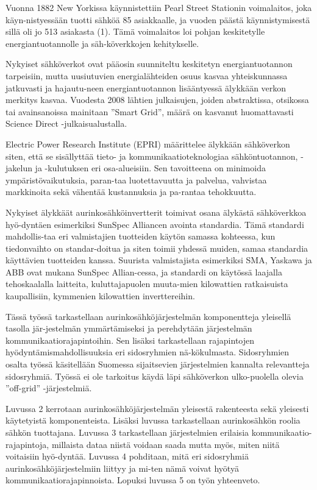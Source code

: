 Vuonna 1882 New Yorkissa käynnistettiin Pearl Street Stationin voimalaitos, joka käyn-nistyessään tuotti sähköä 85 asiakkaalle, ja vuoden päästä käynnistymisestä sillä oli jo 513 asiakasta (1). Tämä voimalaitos loi pohjan keskitetylle energiantuotannolle ja säh-köverkkojen kehitykselle. 

Nykyiset sähköverkot ovat pääosin suunniteltu keskitetyn energiantuotannon tarpeisiin, mutta uusiutuvien energialähteiden osuus kasvaa yhteiskunnassa jatkuvasti ja hajautu-neen energiantuotannon lisääntyessä älykkään verkon merkitys kasvaa. Vuodesta 2008 lähtien julkaisujen, joiden abstraktissa, otsikossa tai avainsanoissa mainitaan ”Smart Grid”, määrä on kasvanut huomattavasti Science Direct -julkaisualustalla.

Electric Power Research Institute (EPRI) määrittelee älykkään sähköverkon siten, että se sisällyttää tieto- ja kommunikaatioteknologiaa sähköntuotannon, -jakelun ja -kulutuksen eri osa-alueisiin. Sen tavoitteena on minimoida ympäristövaikutuksia, paran-taa luotettavuutta ja palvelua, vahvistaa markkinoita sekä vähentää kustannuksia ja pa-rantaa tehokkuutta. 

Nykyiset älykkäät aurinkosähköinvertterit toimivat osana älykästä sähköverkkoa hyö-dyntäen esimerkiksi SunSpec Alliancen avointa standardia. Tämä standardi mahdollis-taa eri valmistajien tuotteiden käytön samassa kohteessa, kun tiedonvaihto on standar-doitua ja siten toimii yhdessä muiden, samaa standardia käyttävien tuotteiden kanssa. Suurista valmistajista esimerkiksi SMA, Yaskawa ja ABB ovat mukana SunSpec Allian-cessa, ja standardi on käytössä laajalla tehoskaalalla laitteita, kuluttajapuolen muuta-mien kilowattien ratkaisuista kaupallisiin, kymmenien kilowattien inverttereihin.

Tässä työssä tarkastellaan aurinkosähköjärjestelmän komponentteja yleisellä tasolla jär-jestelmän ymmärtämiseksi ja perehdytään järjestelmän kommunikaatiorajapintoihin. Sen lisäksi tarkastellaan rajapintojen hyödyntämismahdollisuuksia eri sidosryhmien nä-kökulmasta. Sidosryhmien osalta työssä käsitellään Suomessa sijaitsevien järjestelmien kannalta relevantteja sidosryhmiä. Työssä ei ole tarkoitus käydä läpi sähköverkon ulko-puolella olevia ”off-grid” -järjestelmiä.

Luvussa 2 kerrotaan aurinkosähköjärjestelmän yleisestä rakenteesta sekä yleisesti käytetyistä komponenteista. Lisäksi luvussa tarkastellaan aurinkosähkön roolia sähkön tuottajana. Luvussa 3 tarkastellaan järjestelmien erilaisia kommunikaatio-rajapintoja, millaista dataa niistä voidaan saada mutta myös, miten niitä voitaisiin hyö-dyntää. Luvussa 4 pohditaan, mitä eri sidosryhmiä aurinkosähköjärjestelmiin liittyy ja mi-ten nämä voivat hyötyä kommunikaatiorajapinnoista. Lopuksi luvussa 5 on työn yhteenveto.